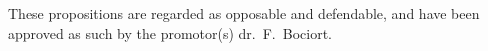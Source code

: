\documentclass{dissertation}
\begin{document}
\bigskip
\bigskip



\begin{center}
These propositions are regarded as opposable and defendable, and have been approved as such by the promotor(s) dr.\ F.\  Bociort.
\end{center}

\begin{comment}
\clearpage
{\selectlanguage{dutch}

\begin{center}

{\Large\titlefont\bfseries Stellingen}

\bigskip

behorende bij het proefschrift

\bigskip

{\makeatletter
\titlestyle\bfseries\large\@title
\makeatother}

{\makeatletter
\ifx\@subtitle\undefined\else
    \titlefont\titleshape\@subtitle
\fi
\makeatother}

\bigskip

door

\bigskip

\makeatletter
{\large\titlefont\bfseries\@firstname\ {\titleshape\@lastname}}
\makeatother

\end{center}

\bigskip
\bigskip

\begin{enumerate}

\item Stelling 1.
\item Stelling 2.
\item Stelling 3.
\item Stelling 4.
\item Stelling 5.
\item Stelling 6.
\item Stelling 7.
\item Stelling 8.
\item Stelling 9.
\item Stelling 10.


\end{comment}
\end{document}
